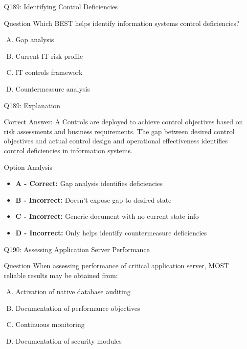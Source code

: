 \documentclass{beamer}
\begin{document}
	\begin{frame}{Q189: Identifying Control Deficiencies}
		\begin{block}{Question}
			Which BEST helps identify information systems control deficiencies?
		\end{block}
		\begin{enumerate}[(A)]
			\item Gap analysis
			\item Current IT risk profile
			\item IT controls framework
			\item Countermeasure analysis
		\end{enumerate}
	\end{frame}
	
	\begin{frame}{Q189: Explanation}
		\begin{block}{Correct Answer: A}
			Controls are deployed to achieve control objectives based on risk assessments and business requirements. The gap between desired control objectives and actual control design and operational effectiveness identifies control deficiencies in information systems.
		\end{block}
		\begin{block}{Option Analysis}
			\begin{itemize}
				\item \textbf{A - Correct:} Gap analysis identifies deficiencies
				\item \textbf{B - Incorrect:} Doesn't expose gap to desired state
				\item \textbf{C - Incorrect:} Generic document with no current state info
				\item \textbf{D - Incorrect:} Only helps identify countermeasure deficiencies
			\end{itemize}
		\end{block}
	\end{frame}
	
	\begin{frame}{Q190: Assessing Application Server Performance}
		\begin{block}{Question}
			When assessing performance of critical application server, MOST reliable results may be obtained from:
		\end{block}
		\begin{enumerate}[(A)]
			\item Activation of native database auditing
			\item Documentation of performance objectives
			\item Continuous monitoring
			\item Documentation of security modules
		\end{enumerate}
	\end{frame}
	
\end{document}
